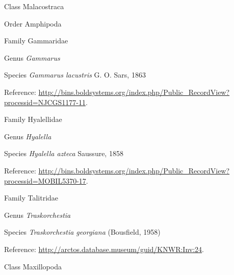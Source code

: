 \documentclass[9pt, article]{memoir}
\begin{document}
\begin{multicols}{2}
\vspace{6pt}\noindent\hspace{12pt}Class Malacostraca


\vspace{6pt}\noindent\hspace{18pt}Order Amphipoda


\vspace{6pt}\noindent\hspace{24pt}Family Gammaridae


\vspace{6pt}\noindent\hspace{30pt}Genus \textit{Gammarus}


\vspace{6pt}\noindent\hspace{36pt}Species \textit{Gammarus lacustris} G. O. Sars, 1863


Reference: 
\url{http://bins.boldsystems.org/index.php/Public_RecordView?processid=NJCGS1177-11}.

\vspace{6pt}\noindent\hspace{24pt}Family Hyalellidae


\vspace{6pt}\noindent\hspace{30pt}Genus \textit{Hyalella}


\vspace{6pt}\noindent\hspace{36pt}Species \textit{Hyalella azteca} Saussure, 1858


Reference: 
\url{http://bins.boldsystems.org/index.php/Public_RecordView?processid=MOBIL5370-17}.

\vspace{6pt}\noindent\hspace{24pt}Family Talitridae


\vspace{6pt}\noindent\hspace{30pt}Genus \textit{Traskorchestia}


\vspace{6pt}\noindent\hspace{36pt}Species \textit{Traskorchestia georgiana} (Bousfield, 1958)


Reference: 
\url{http://arctos.database.museum/guid/KNWR:Inv:24}.

\vspace{6pt}\noindent\hspace{12pt}Class Maxillopoda



\end{multicols}
\end{document}
